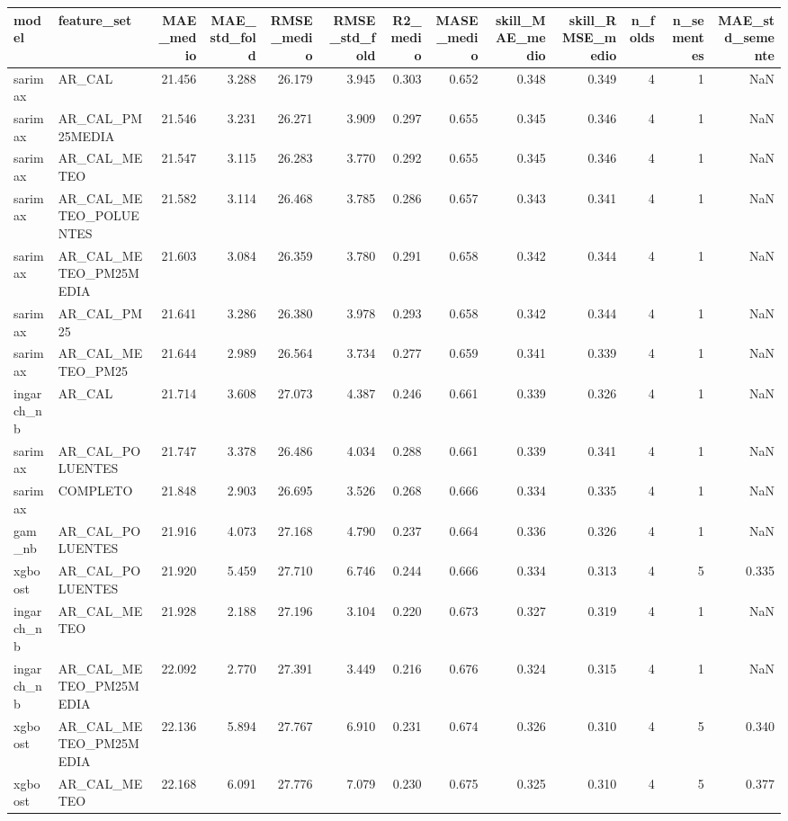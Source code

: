 \begin{tabular}{llrrrrrrrrrrr}
\toprule
model & feature_set & MAE_medio & MAE_std_fold & RMSE_medio & RMSE_std_fold & R2_medio & MASE_medio & skill_MAE_medio & skill_RMSE_medio & n_folds & n_sementes & MAE_std_semente \\
\midrule
sarimax & AR_CAL & 21.456 & 3.288 & 26.179 & 3.945 & 0.303 & 0.652 & 0.348 & 0.349 & 4 & 1 & NaN \\
sarimax & AR_CAL_PM25MEDIA & 21.546 & 3.231 & 26.271 & 3.909 & 0.297 & 0.655 & 0.345 & 0.346 & 4 & 1 & NaN \\
sarimax & AR_CAL_METEO & 21.547 & 3.115 & 26.283 & 3.770 & 0.292 & 0.655 & 0.345 & 0.346 & 4 & 1 & NaN \\
sarimax & AR_CAL_METEO_POLUENTES & 21.582 & 3.114 & 26.468 & 3.785 & 0.286 & 0.657 & 0.343 & 0.341 & 4 & 1 & NaN \\
sarimax & AR_CAL_METEO_PM25MEDIA & 21.603 & 3.084 & 26.359 & 3.780 & 0.291 & 0.658 & 0.342 & 0.344 & 4 & 1 & NaN \\
sarimax & AR_CAL_PM25 & 21.641 & 3.286 & 26.380 & 3.978 & 0.293 & 0.658 & 0.342 & 0.344 & 4 & 1 & NaN \\
sarimax & AR_CAL_METEO_PM25 & 21.644 & 2.989 & 26.564 & 3.734 & 0.277 & 0.659 & 0.341 & 0.339 & 4 & 1 & NaN \\
ingarch_nb & AR_CAL & 21.714 & 3.608 & 27.073 & 4.387 & 0.246 & 0.661 & 0.339 & 0.326 & 4 & 1 & NaN \\
sarimax & AR_CAL_POLUENTES & 21.747 & 3.378 & 26.486 & 4.034 & 0.288 & 0.661 & 0.339 & 0.341 & 4 & 1 & NaN \\
sarimax & COMPLETO & 21.848 & 2.903 & 26.695 & 3.526 & 0.268 & 0.666 & 0.334 & 0.335 & 4 & 1 & NaN \\
gam_nb & AR_CAL_POLUENTES & 21.916 & 4.073 & 27.168 & 4.790 & 0.237 & 0.664 & 0.336 & 0.326 & 4 & 1 & NaN \\
xgboost & AR_CAL_POLUENTES & 21.920 & 5.459 & 27.710 & 6.746 & 0.244 & 0.666 & 0.334 & 0.313 & 4 & 5 & 0.335 \\
ingarch_nb & AR_CAL_METEO & 21.928 & 2.188 & 27.196 & 3.104 & 0.220 & 0.673 & 0.327 & 0.319 & 4 & 1 & NaN \\
ingarch_nb & AR_CAL_METEO_PM25MEDIA & 22.092 & 2.770 & 27.391 & 3.449 & 0.216 & 0.676 & 0.324 & 0.315 & 4 & 1 & NaN \\
xgboost & AR_CAL_METEO_PM25MEDIA & 22.136 & 5.894 & 27.767 & 6.910 & 0.231 & 0.674 & 0.326 & 0.310 & 4 & 5 & 0.340 \\
xgboost & AR_CAL_METEO & 22.168 & 6.091 & 27.776 & 7.079 & 0.230 & 0.675 & 0.325 & 0.310 & 4 & 5 & 0.377 \\

\end{tabular}
